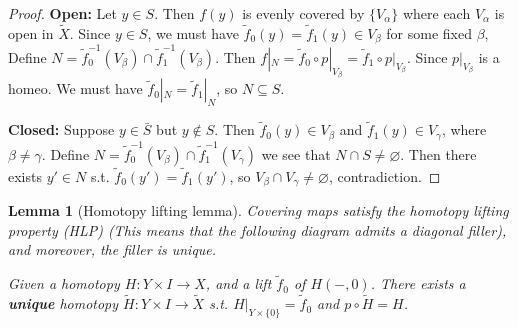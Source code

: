 \documentclass{article}
\theoremstyle{definition}
\theoremstyle{remark}
\theoremstyle{plain}
\newtheorem{lem}[defn]{Lemma}
\begin{document}
\begin{proof}
    \textbf{Open:} Let $y\in S$. Then $f(y)$ is evenly covered by $\{V_\alpha\}$ where each $V_\alpha$ is open in $\tilde X$. Since $y\in S$, we must have $\tilde f_0(y)=\tilde f_1(y)\in V_\beta$ for some fixed $\beta$, Define $N=\tilde f_0^{-1}(V_\beta)\cap\tilde f_1^{-1}(V_\beta)$. Then $f|_N=\tilde f_0\circ p|_{V_\beta}=\tilde f_1\circ p|_{V_\beta}$. Since $p|_{V_\beta}$ is a homeo. We must have $\tilde f_0|_N=\tilde f_1|_N$, so $N\subseteq S$.

    \textbf{Closed:} Suppose $y\in \bar S$ but $y\not\in S$. Then $\tilde f_0(y)\in V_\beta$ and $\tilde f_1(y)\in V_\gamma$, where $\beta\neq \gamma$. Define $N=\tilde f_0^{-1}(V_\beta)\cap \tilde f_1^{-1}(V_\gamma)$ we see that $N\cap S\neq\varnothing$. Then there exists $y'\in N$ s.t. $\tilde f_0(y')=\tilde f_1(y')$, so $V_\beta\cap V_\gamma\neq\varnothing$, contradiction.
\end{proof}
\begin{lem}[Homotopy lifting lemma]
    Covering maps satisfy the homotopy lifting property (HLP) (This means that the following diagram admits a diagonal filler), and moreover, the filler is unique.
    \begin{center}
    \end{center}
    Given a homotopy $H:Y\times I\to X$, and a lift $\tilde f_0$ of $H(-,0)$. There exists a \textbf{unique} homotopy $\tilde H:Y\times I\to \tilde X$ s.t. $H|_{Y\times\{0\}}=\tilde f_0$ and $p\circ\tilde H=H$.
\end{lem}
\end{document}
